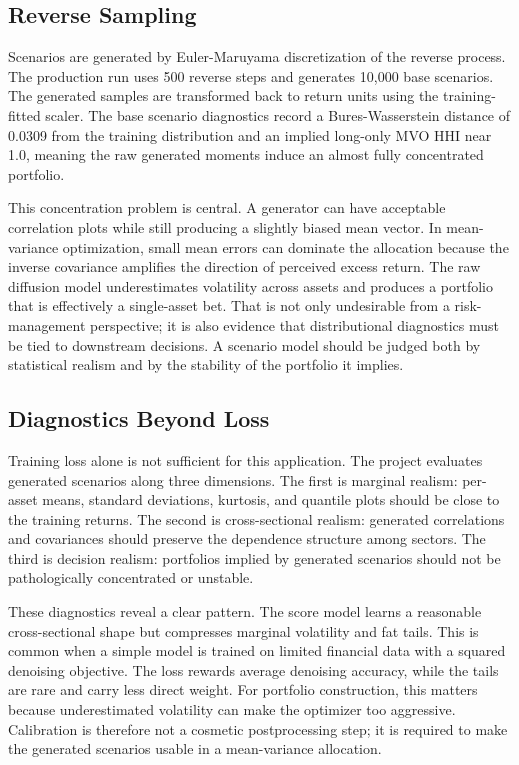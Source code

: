\documentclass{article}
\begin{document}
\subsection{Reverse Sampling}

Scenarios are generated by Euler-Maruyama discretization of the reverse process.
The production run uses 500 reverse steps and generates 10,000 base scenarios.
The generated samples are transformed back to return units using the
training-fitted scaler. The base scenario diagnostics record a
Bures-Wasserstein distance of 0.0309 from the training distribution and an
implied long-only MVO HHI near 1.0, meaning the raw generated moments induce an
almost fully concentrated portfolio.

This concentration problem is central. A generator can have acceptable
correlation plots while still producing a slightly biased mean vector. In
mean-variance optimization, small mean errors can dominate the allocation because
the inverse covariance amplifies the direction of perceived excess return. The
raw diffusion model underestimates volatility across assets and produces a
portfolio that is effectively a single-asset bet. That is not only undesirable
from a risk-management perspective; it is also evidence that distributional
diagnostics must be tied to downstream decisions. A scenario model should be
judged both by statistical realism and by the stability of the portfolio it
implies.

\subsection{Diagnostics Beyond Loss}

Training loss alone is not sufficient for this application. The project evaluates
generated scenarios along three dimensions. The first is marginal realism:
per-asset means, standard deviations, kurtosis, and quantile plots should be
close to the training returns. The second is cross-sectional realism: generated
correlations and covariances should preserve the dependence structure among
sectors. The third is decision realism: portfolios implied by generated
scenarios should not be pathologically concentrated or unstable.

These diagnostics reveal a clear pattern. The score model learns a reasonable
cross-sectional shape but compresses marginal volatility and fat tails. This is
common when a simple model is trained on limited financial data with a squared
denoising objective. The loss rewards average denoising accuracy, while the
tails are rare and carry less direct weight. For portfolio construction, this
matters because underestimated volatility can make the optimizer too aggressive.
Calibration is therefore not a cosmetic postprocessing step; it is required to
make the generated scenarios usable in a mean-variance allocation.
\end{document}
